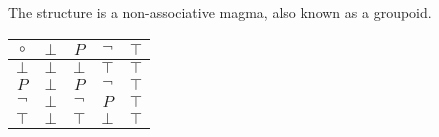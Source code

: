 \begin{remark}
The structure is a non-associative magma, also known as a groupoid. \begin{table}[h!]\centering
	\begin{tabular}{c||c|c|c|c}
		$\circ$ & $\bot$ & $P$ & $\lnot$ & $\top$ \\ \hline\hline
		$\bot$ & $\bot$ & $\bot$ & $\top$ & $\top$ \\ \hline
		$P$ & $\bot$ & $P$ & $\lnot$ & $\top$ \\ \hline
		$\lnot$ & $\bot$ & $\lnot$ & $P$ & $\top$ \\ \hline
		$\top$ & $\bot$ & $\top$ & $\bot$ & $\top$
	\end{tabular}
\end{table}
\end{remark}


